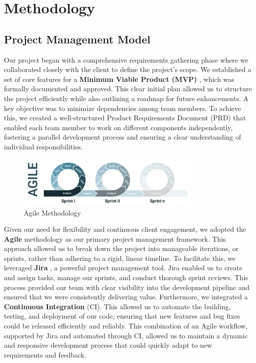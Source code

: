 \chapter{Methodology}
\section{ Project Management Model}

Our project began with a comprehensive requirements gathering phase where we collaborated closely with the client to define the project's scope. We established a set of core features for a \textbf{Minimum Viable Product (MVP)} \cite{atlassian_mvp}, which was formally documented and approved. This clear initial plan allowed us to structure the project efficiently while also outlining a roadmap for future enhancements. A key objective was to minimize dependencies among team members. To achieve this, we created a well-structured Product Requirements Document (PRD) \cite{atlassian_requirements} that enabled each team member to work on different components independently, fostering a parallel development process and ensuring a clear understanding of individual responsibilities.

\begin{figure}[h]
    \centering
    \includegraphics[width=0.8\textwidth]{agile.jpeg}
    \caption{Agile Methodology}
    \label{fig:agile}
\end{figure}

Given our need for flexibility and continuous client engagement, we adopted the \textbf{Agile} methodology \cite{atlassian_agile} as our primary project management framework. This approach allowed us to break down the project into manageable iterations, or sprints, rather than adhering to a rigid, linear timeline. To facilitate this, we leveraged \textbf{Jira} \cite{atlassian_jira}, a powerful project management tool. Jira enabled us to create and assign tasks, manage our sprints, and conduct thorough sprint reviews. This process provided our team with clear visibility into the development pipeline and ensured that we were consistently delivering value. Furthermore, we integrated a \textbf{Continuous Integration} (CI)\cite{atlassian_ci}. This allowed us to automate the building, testing, and deployment of our code, ensuring that new features and bug fixes could be released efficiently and reliably. This combination of an Agile workflow, supported by Jira and automated through CI, allowed us to maintain a dynamic and responsive development process that could quickly adapt to new requirements and feedback.

